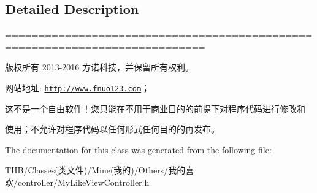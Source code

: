 \subsection{Detailed Description}
============================================================================

版权所有 2013-\/2016 方诺科技，并保留所有权利。

网站地址\+: \href{http://www.fnuo123.com}{\tt http\+://www.\+fnuo123.\+com}； 



这不是一个自由软件！您只能在不用于商业目的的前提下对程序代码进行修改和

使用；不允许对程序代码以任何形式任何目的的再发布。 

 

The documentation for this class was generated from the following file\+:\begin{DoxyCompactItemize}
\item 
T\+H\+B/\+Classes(类文件)/\+Mine(我的)/\+Others/我的喜欢/controller/My\+Like\+View\+Controller.\+h\end{DoxyCompactItemize}

